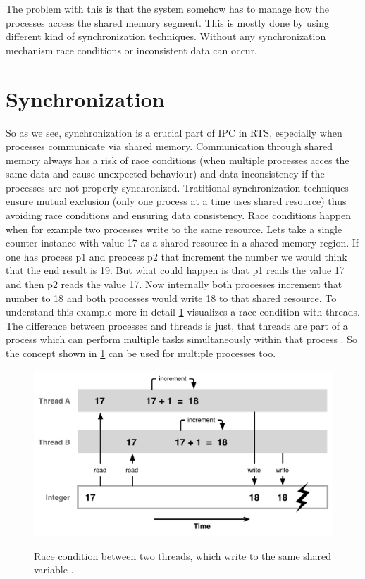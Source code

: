 The problem with this is that the system somehow has to manage how the processes access the shared memory segment. This is mostly done by using different kind of synchronization techniques. Without any synchronization mechanism race conditions or inconsistent data can occur. \cite{IPCMechanisms, SharedMemory}

\section{Synchronization}\label{sec:synchronization}

So as we see, synchronization is a crucial part of \ac{IPC} in \ac{RTS}, especially when processes communicate via shared memory. Communication through shared memory always has a risk of race conditions (when multiple processes acces the same data and cause unexpected behaviour) and data inconsistency if the processes are not properly synchronized. Tratitional synchronization techniques ensure mutual exclusion (only one process at a time uses shared resource) thus avoiding race conditions and ensuring data consistency. Race conditions happen when for example two processes write to the same resource. Lets take a single counter instance with value 17 as a shared resource in a shared memory region. If one has process p1 and preocess p2 that increment the number we would think that the end result is 19. But what could happen is that p1 reads the value 17 and then p2 reads the value 17. Now internally both processes increment that number to 18 and both processes would write 18 to that shared resource. To understand this example more in detail \cref{fig:race-condition} visualizes a race condition with threads. The difference between processes and threads is just, that threads are part of a process which can perform multiple tasks simultaneously within that process \cite{DiffProcessThread}. So the concept shown in \cref{fig:race-condition} can be used for multiple processes too.

\begin{figure}[!ht]
   \centering
   \captionsetup{justification=centering}
   \caption{Race condition between two threads, which write to the same shared variable \cite{Race-Condition}.}
   \includegraphics[width=115mm]{images/race-condition.png}
   \label{fig:race-condition}
\end{figure}

